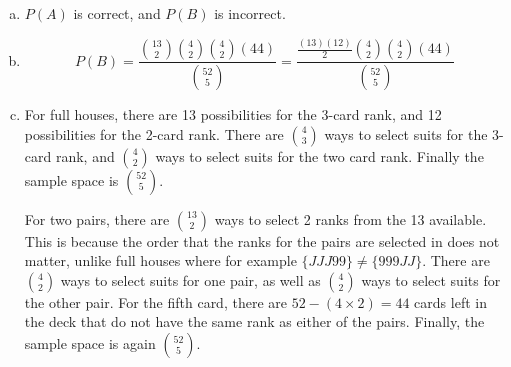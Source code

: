 \documentclass{article}
\begin{document}
\section{}
\begin{enumerate}[(a)]
\item
$P(A)$ is correct, and $P(B)$ is incorrect.
\item
\[
P(B) = \frac{{{13}\choose{2}} {{4}\choose{2}} {{4}\choose{2}} (44)}
{{{52}\choose{5}}} = 
\frac{\frac{(13)(12)}{2} {{4}\choose{2}} {{4}\choose{2}} (44)}
{{{52}\choose{5}}}
\]
\item
For full houses, there are 13 possibilities for the 3-card rank, and 12
possibilities for the 2-card rank. There are ${{4}\choose{3}}$ ways to select
suits for the 3-card rank, and ${{4}\choose{2}}$ ways to select suits for the
two card rank. Finally the sample space is ${{52}\choose{5}}$.

For two pairs, there are ${{13}\choose{2}}$ ways to select 2 ranks from the 13
available. This is because the order that the ranks for the pairs are
selected in does not matter, unlike full houses
where for example $\{JJJ99\} \ne \{999JJ\}$. There are ${{4}\choose{2}}$ ways
to select suits for one pair, as well as ${{4}\choose{2}}$ ways to select suits
for the other pair. For the fifth card, there are $52-(4 \times 2) = 44$ cards
left in the deck that do not have the same rank as either of the pairs. Finally,
the sample space is again ${{52}\choose{5}}$.

\end{enumerate}
\end{document}
